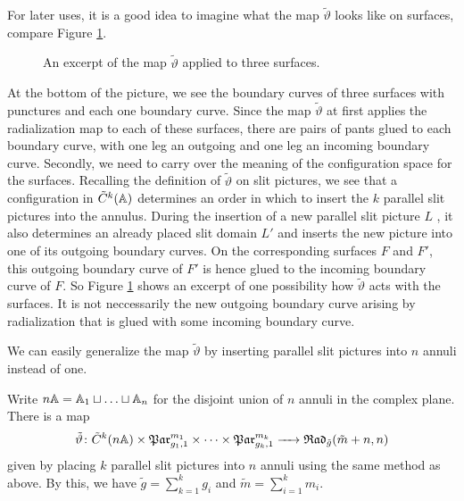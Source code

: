 For later uses, it is a good idea to imagine what the map $\tilde \vartheta$ looks like on surfaces, compare Figure \ref{rad_par_operad_on_surfaces}.
\begin{figure}[ht]
\centering
\def\svgwidth{.9\columnwidth}

\caption{\label{rad_par_operad_on_surfaces} An excerpt of the map $\tilde \vartheta$ applied to three surfaces.}
\end{figure}
At the bottom of the picture, we see the boundary curves of three surfaces with punctures and each one boundary curve.
Since the map $\tilde \vartheta$ at first applies the radialization map to each of these surfaces, 
there are pairs of pants glued to each boundary curve, with one leg an outgoing and one leg an incoming boundary curve.
Secondly, we need to carry over the meaning of the configuration space for the surfaces.
Recalling the definition of $\tilde \vartheta$ on slit pictures, we see that a configuration in $\tilde C^k(\mathbb A)$ determines an order in which to insert the $k$ parallel slit pictures into the annulus.
During the insertion of a new parallel slit picture $L$ , it also determines an already placed slit domain $L'$ and inserts the new picture into one of its outgoing boundary curves.
On the corresponding surfaces $F$ and $F'$, this outgoing boundary curve of $F'$ is hence glued to the incoming boundary curve of $F$. 
So Figure \ref{rad_par_operad_on_surfaces} shows an excerpt of one possibility how $\tilde \vartheta$ acts with the surfaces. 
It is not neccessarily the new outgoing boundary curve arising by radialization that is glued with some incoming boundary curve.

We can easily generalize the map $\tilde \vartheta$ by inserting parallel slit pictures into $n$ annuli instead of one. 

\begin{defi}
\label{pars_into_n_annuli}
Write $n \mathbb A = \mathbb A_1 \sqcup \dotsc \sqcup \mathbb A_n$ for the disjoint union of $n$ annuli in the complex plane.
There is a map
\[
   \tilde \vartheta \colon \tilde C^k(n\mathbb A) \times \mathfrak{Par}_{g_1, 1}^{m_1} \times \dotsb \times \mathfrak{Par}_{g_k, 1}^{m_k} \xrightarrow{\hspace{6pt}{}\hspace{6pt}} \mathfrak{Rad}_{\tilde g}(\tilde m + n, n) 
\]
given by placing $k$ parallel slit pictures into $n$ annuli using the same method as above.
By this, we have $\tilde g = \sum_{k = 1}^k g_i$ and $\tilde m = \sum_{i = 1}^k m_i$.
\end{defi}

